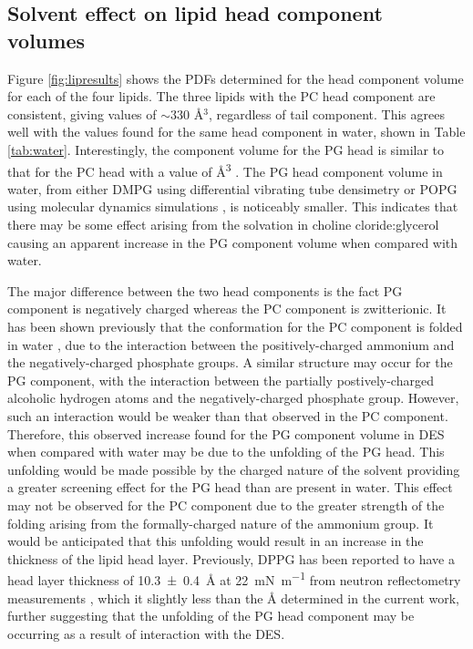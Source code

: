 \documentclass[amsmath,amssymb,twocolumn,superscriptaddress]{revtex4-1}
\begin{document}
\subsection{Solvent effect on lipid head component volumes}
%
Figure \ref{fig:lipresults} shows the PDFs determined for the head component volume for each of the four lipids.
The three lipids with the PC head component are consistent, giving values of $\sim330$ \AA$^3$, regardless of tail component.
This agrees well with the values found for the same head component in water, shown in Table \ref{tab:water}.
Interestingly, the component volume for the PG head is similar to that for the PC head with a value of \si{\angstrom\cubed} .
The PG head component volume in water, from either DMPG using differential vibrating tube densimetry \cite{Pan2012} or POPG using molecular dynamics simulations \cite{Kucerka2012}, is noticeably smaller.
This indicates that there may be some effect arising from the solvation in choline cloride:glycerol causing an apparent increase in the PG component volume when compared with water.

The major difference between the two head components is the fact PG component is negatively charged whereas the PC component is zwitterionic.
It has been shown previously that the conformation for the PC component is folded in water \cite{Gilliams2016}, due to the interaction between the positively-charged ammonium and the negatively-charged phosphate groups.
A similar structure may occur for the PG component, with the interaction between the partially postively-charged alcoholic hydrogen atoms and the negatively-charged phosphate group.
However, such an interaction would be weaker than that observed in the PC component.
Therefore, this observed increase found for the PG component volume in DES when compared with water may be due to the unfolding of the PG head.
This unfolding would be made possible by the charged nature of the solvent providing a greater screening effect for the PG head than are present in water.
This effect may not be observed for the PC component due to the greater strength of the folding arising from the formally-charged nature of the ammonium group.
It would be anticipated that this unfolding would result in an increase in the thickness of the lipid head layer.
Previously, DPPG has been reported to have a head layer thickness of \SI{10.3\pm0.4}{\angstrom} at \SI{22}{\milli\newton\per\meter} from neutron reflectometry measurements \cite{Clifton2012}, which it slightly less than the \si{\angstrom} determined in the current work, further suggesting that the unfolding of the PG head component may be occurring as a result of interaction with the DES.
\end{document}
